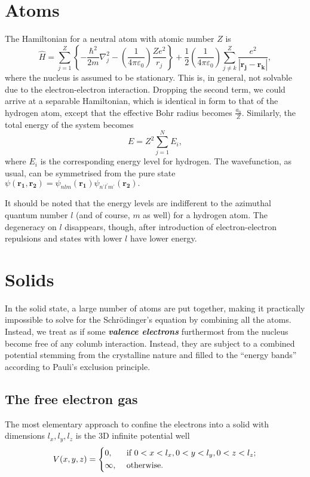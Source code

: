 \documentclass{article}
\theoremstyle{nonumberplain}
\begin{document}
\section{Atoms}
The Hamiltonian for a neutral atom with atomic number $Z$ is 
\[
    \hat{H} = 
    \sum\limits_{j=1}^{Z} \left\{ -\frac{\hbar ^{2}}{2m} \nabla ^{2} _j -\left( \frac{1}{4 \pi \varepsilon_0}   \right) \frac{Ze^{2} }{r_j}\right\} + 
    \frac{1}{2} \left( \frac{1}{4 \pi  \varepsilon_0}\right) \sum\limits_{j\neq k}^{Z} \frac{e^{2} }{\left\vert \mathbf{r_j} - \mathbf{r_k}  \right\vert },
\]
where the nucleus is assumed to be stationary. This is, in general, not solvable due to the electron-electron interaction. Dropping the second term, we could arrive at a separable Hamiltonian, which is identical in form to that of the hydrogen atom, except that the effective Bohr radius becomes $\frac{a_0}{Z}$. Similarly, the total energy of the system becomes 
\[
    E = Z^{2} \sum\limits_{j=1}^{N} E_i, 
\]
where $E_i$ is the corresponding energy level for hydrogen. The wavefunction, as usual, can be symmetrised from the pure state 
\(
    \psi(\mathbf{r_1}, \mathbf{r_2}  ) = \psi_{nlm} (\mathbf{r_1} ) \psi_{n^\prime l^\prime m^\prime } (\mathbf{r_2} ).
\) 

It should be noted that the energy levels are indifferent to the azimuthal quantum number $l$ (and of course, $m$ as well) for a hydrogen atom. The degeneracy on $l$ disappears, though, after introduction of electron-electron repulsions and states with lower $l$ have lower energy. 
\section{Solids}
In the solid state, a large number of atoms are put together, making it practically impossible to solve for the Schrödinger's equation by combining all the atoms. Instead, we treat as if some \textit{\textbf{valence electrons}} furthermost from the nucleus become free of any columb interaction. Instead, they are subject to a combined potential stemming from the crystalline nature and filled to the ``energy bands'' according to Pauli's exclusion principle.
\subsection{The free electron gas}
The most elementary approach to confine the electrons into a solid with dimensions $l_x, l_y, l_z$ is the 3D infinite potential well
\[
    V(x,y,z) = 
    \begin{dcases}
        0, &\text{ if } 0<x<l_x, 0<y<l_y, 0<z<l_z ;\\
        \infty , &\text{ otherwise}  .
    \end{dcases}
\]
\end{document}
